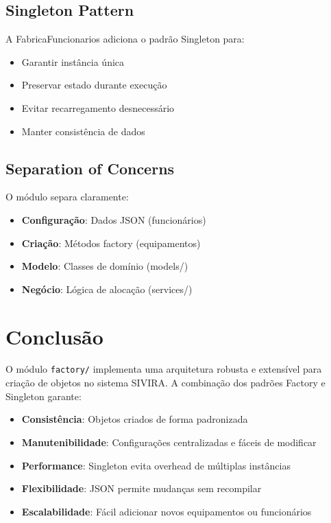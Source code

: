 \documentclass[11pt,a4paper]{article}
\begin{document}
\subsection{Singleton Pattern}

A FabricaFuncionarios adiciona o padrão Singleton para:

\begin{itemize}
    \item Garantir instância única
    \item Preservar estado durante execução
    \item Evitar recarregamento desnecessário
    \item Manter consistência de dados
\end{itemize}

\subsection{Separation of Concerns}

O módulo separa claramente:

\begin{itemize}
    \item \textbf{Configuração}: Dados JSON (funcionários)
    \item \textbf{Criação}: Métodos factory (equipamentos)
    \item \textbf{Modelo}: Classes de domínio (models/)
    \item \textbf{Negócio}: Lógica de alocação (services/)
\end{itemize}

\newpage

\section{Conclusão}

O módulo \texttt{factory/} implementa uma arquitetura robusta e extensível para criação de objetos no sistema SIVIRA. A combinação dos padrões Factory e Singleton garante:

\begin{itemize}
    \item \textbf{Consistência}: Objetos criados de forma padronizada
    \item \textbf{Manutenibilidade}: Configurações centralizadas e fáceis de modificar
    \item \textbf{Performance}: Singleton evita overhead de múltiplas instâncias
    \item \textbf{Flexibilidade}: JSON permite mudanças sem recompilar
    \item \textbf{Escalabilidade}: Fácil adicionar novos equipamentos ou funcionários
\end{itemize}
\end{document}
